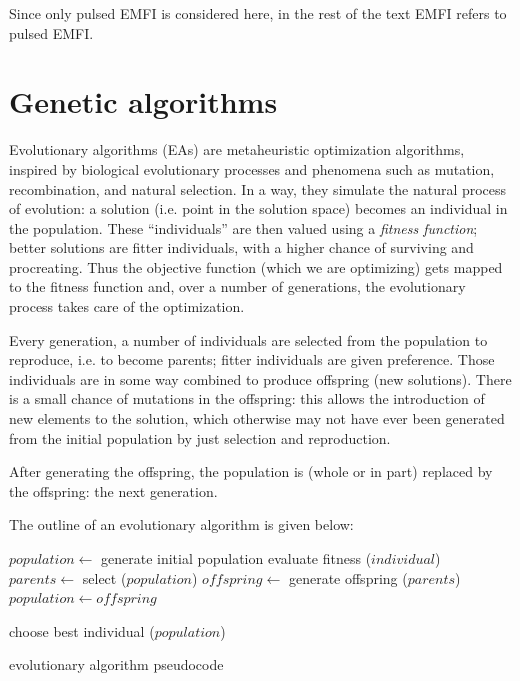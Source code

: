 \documentclass[times, utf8, diplomski]{fer}
\begin{document}
Since only pulsed EMFI is considered here, in the rest of the text EMFI refers
to pulsed EMFI.


\section{Genetic algorithms}\label{sec:GAs}
Evolutionary algorithms (EAs) are metaheuristic optimization algorithms,
inspired by biological evolutionary processes and phenomena such as mutation,
recombination, and natural selection.
In a way, they simulate the natural process of evolution: a solution
(i.e. point in the solution space) becomes an individual in the population.
These ``individuals'' are then valued using a \emph{fitness function}; better
solutions are fitter individuals, with a higher chance of surviving and procreating.
Thus the objective function (which we are optimizing) gets mapped to the fitness function
and, over a number of generations, the evolutionary process takes care of the optimization.

Every generation, a number of individuals are selected from the population to
reproduce, i.e. to become parents; fitter individuals are given preference.
Those individuals are in some way combined to produce offspring (new solutions).
There is a small chance of mutations in the offspring: this allows the introduction
of new elements to the solution, which otherwise may not have ever been generated
from the initial population by just selection and reproduction.

After generating the offspring, the population is (whole or in part) replaced
by the offspring: the next generation.

The outline of an evolutionary algorithm is given below:
\begin{algorithm}[h]\label{algo:evolutionary}
    \begin{algorithmic}
        \STATE $\mathit{population} \gets$ generate initial population
        \REPEAT
                \STATE evaluate fitness ($\mathit{individual}$)
            \ENDFOR
            \STATE $\mathit{parents}    \gets$ select ($\mathit{population}$)
            \STATE $\mathit{offspring}  \gets$ generate offspring ($\mathit{parents}$)
            \STATE $\mathit{population} \gets  \mathit{offspring}$


        \RETURN choose best individual ($population$)
    \end{algorithmic}
    \caption{evolutionary algorithm pseudocode}
\end{algorithm}
\end{document}
